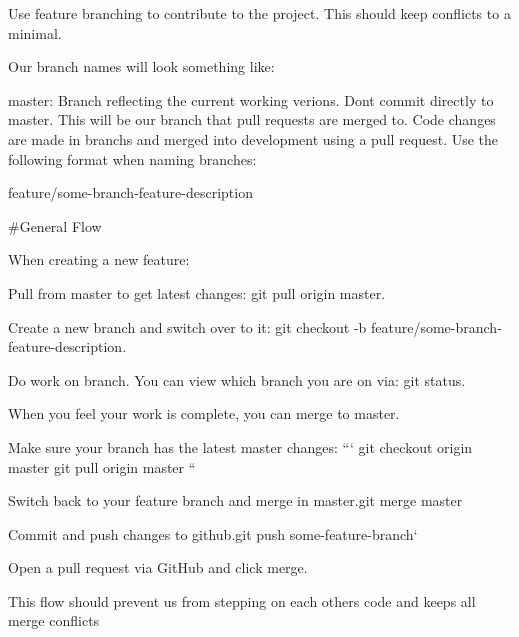 Use feature branching to contribute to the project. This should keep conflicts to a minimal.

Our branch names will look something like\+:
\begin{DoxyItemize}
\item {\ttfamily master}\+: Branch reflecting the current working verions. Don\textquotesingle{}t commit directly to master. This will be our branch that pull requests are merged to. Code changes are made in branchs and merged into development using a pull request. Use the following format when naming branches\+:
\begin{DoxyItemize}
\item {\ttfamily feature/some-\/branch-\/feature-\/description}
\end{DoxyItemize}
\end{DoxyItemize}

\#\+General Flow
\begin{DoxyItemize}
\item When creating a new feature\+:
\end{DoxyItemize}
\begin{DoxyEnumerate}
\item Pull from master to get latest changes\+: {\ttfamily git pull origin master}.
\item Create a new branch and switch over to it\+: {\ttfamily git checkout -\/b feature/some-\/branch-\/feature-\/description}.
\item Do work on branch. You can view which branch you are on via\+: {\ttfamily git status}.
\item When you feel your work is complete, you can merge to master.
\begin{DoxyItemize}
\item Make sure your branch has the latest master changes\+: ``` git checkout origin master git pull origin master ``{\ttfamily }
\item {\ttfamily Switch back to your feature branch and merge in master.}git merge master{\ttfamily }
\item {\ttfamily Commit and push changes to github.}git push some-\/feature-\/branch`
\item Open a pull request via Git\+Hub and click merge.
\end{DoxyItemize}
\end{DoxyEnumerate}

This flow should prevent us from stepping on each others code and keeps all merge conflicts 